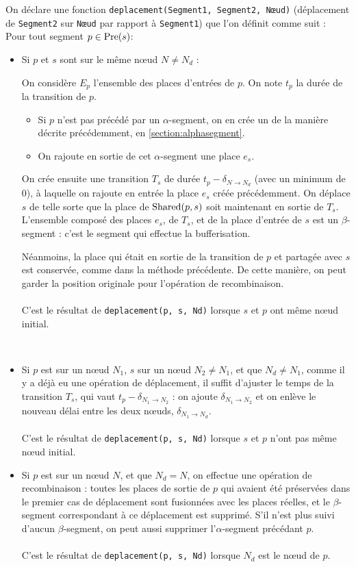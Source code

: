 On déclare une fonction \texttt{deplacement(Segment1, Segment2, Nœud)} (déplacement de \texttt{Segment2} sur \texttt{Nœud} par rapport à \texttt{Segment1}) que l'on définit comme suit :
~ \\
Pour tout segment $p \in \operatorname{Pre}(s)$:
\begin{itemize}
\item {Si $p$ et $s$ sont sur le même nœud $N \neq N_d$ :

On considère $E_{p}$ l'ensemble des places d'entrées de $p$.
On note $t_p$ la durée de la transition de $p$.

\begin{itemize}
\item Si $p$ n'est pas précédé par un $\alpha$-segment, on en crée un de la manière décrite précédemment, en \ref{section:alphasegment}.
\item On rajoute en sortie de cet $\alpha$-segment une place $e_s$.
\end{itemize}
\vspace{1em}

On crée ensuite une transition $T_s$ de durée $t_p - \delta_{N \rightarrow N_d}$ (avec un minimum de 0), à laquelle on rajoute en entrée la place $e_s$ créée précédemment. On déplace $s$ de telle sorte que la place de $\operatorname{Shared}(p, s)$ soit maintenant en sortie de $T_s$.
L'ensemble composé des places $e_s$, de $T_s$, et de la place d'entrée de $s$ est un $\beta$-segment : c'est le segment qui effectue la bufferisation.

Néanmoins, la place qui était en sortie de la transition de $p$ et partagée avec $s$ est conservée, comme dans la méthode précédente. De cette manière, on peut garder la position originale pour l'opération de recombinaison.
~ \\
~ \\
C'est le résultat de \texttt{deplacement(p, s, Nd)} lorsque $s$ et $p$ ont même nœud initial.
}
\\
\item Si $p$ est sur un nœud $N_1$, $s$ sur un nœud $N_2 \neq N_1$, et que $N_d \neq N_1$, comme il y a déjà eu une opération de déplacement, il suffit d'ajuster le temps de la transition $T_s$, qui vaut $t_p - \delta_{N_1 \rightarrow N_2}$ : on ajoute $\delta_{N_1 \rightarrow N_2}$ et on enlève le nouveau délai entre les deux nœuds, $\delta_{N_1 \rightarrow N_d}$.
~ \\
~ \\
C'est le résultat de \texttt{deplacement(p, s, Nd)} lorsque $s$ et $p$ n'ont pas même nœud initial.
\\
\item Si $p$ est sur un nœud $N$, et que $N_d = N$, on effectue une opération de recombinaison : toutes les places de sortie de $p$ qui avaient été préservées dans le premier cas de déplacement sont fusionnées avec les places réelles, et le $\beta$-segment correspondant à ce déplacement est supprimé. S'il n'est plus suivi d'aucun $\beta$-segment, on peut aussi supprimer l'$\alpha$-segment précédant $p$.
~ \\
~ \\
C'est le résultat de \texttt{deplacement(p, s, Nd)} lorsque $N_d$ est le nœud de $p$.
\end{itemize}

